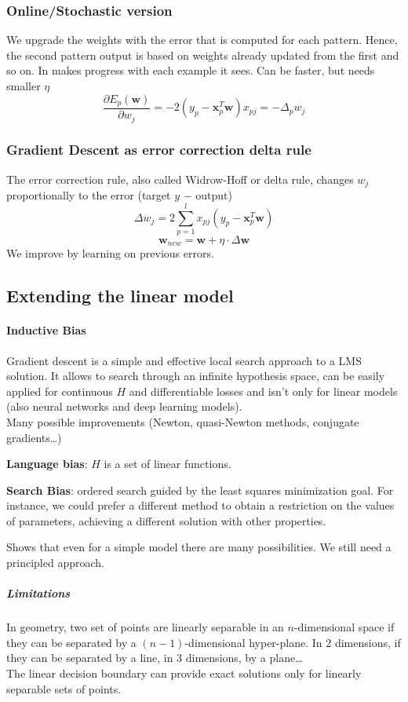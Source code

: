\documentclass[10pt]{report}
\begin{document}
\subsubsection{Online/Stochastic version} We upgrade the weights with the error that is computed for each pattern. Hence, the second pattern output is based on weights already updated from the first and so on. In makes progress with each example it sees. Can be faster, but needs smaller $\eta$
$$\frac{\partial E_p(\mathbf{w})}{\partial w_j} = -2(y_p - \mathbf{x}_p^T \mathbf{w})x_{pj} = -\Delta_p w_j$$
\subsubsection{Gradient Descent as error correction delta rule} The error correction rule, also called Widrow-Hoff or delta rule, changes $w_j$ proportionally to the error (target $y$ $-$ output)
$$\Delta w_j = 2 \sum_{p=1}^l x_{pj} (y_p - \mathbf{x}_p^T \mathbf{w})$$
$$\mathbf{w}_{new} = \mathbf{w} + \eta\cdot\Delta \mathbf{w}$$
We improve by learning on previous errors.
\subsection{Extending the linear model}
\paragraph{Inductive Bias}
Gradient descent is a simple and effective local search approach to a LMS solution. It allows to search through an infinite hypothesis space, can be easily applied for continuous $H$ and differentiable losses and isn't only for linear models (also neural networks and deep learning models).\\
Many possible improvements (Newton, quasi-Newton methods, conjugate gradients\ldots)
\begin{list}{}{}
	\item \textbf{Language bias}: $H$ is a set of linear functions.
	\item \textbf{Search Bias}: ordered search guided by the least squares minimization goal. For instance, we could prefer a different method to obtain a restriction on the values of parameters, achieving a different solution with other properties.
\end{list}
Shows that even for a simple model there are many possibilities. We still need a principled approach.
\subparagraph{Limitations} In geometry, two set of points are linearly separable in an $n$-dimensional space if they can be separated by a $(n-1)$-dimensional hyper-plane. In 2 dimensions, if they can be separated by a line, in 3 dimensions, by a plane\ldots\\
The linear decision boundary can provide exact solutions only for linearly separable sets of points.
\end{document}

